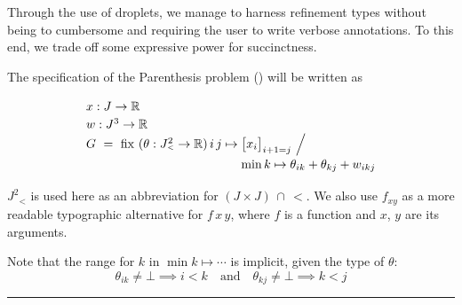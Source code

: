 \cbstart{}%
Through the use of droplets, we manage to harness refinement types without being to 
cumbersome and requiring the user to write verbose annotations.
To this end, we trade off some expressive power for succinctness.
\cbend

\exampleTitle

\noindent
\cbstart{}%
The specification of the Parenthesis problem () will be written as

\vspace{-5mm}
\newcommand\Jsquaredlt{J^2\!\!\!{\scriptscriptstyle _{<}}}
\[
  \renewcommand\arraystretch{1.2}
  \begin{array}{@{}l@{}l@{}l@{}}
    \lspan2{x : J \to \R} \\
    \lspan2{w : J^3 \to \R} \\
    G ~=~ \fix~(\theta:\Jsquaredlt\to\R)\,i\,j \mapsto{}
      & \big[x_i\big]_{i+1=j} ~\Big/ \\
      & \min k\mapsto\theta_{ik}+\theta_{kj}+w_{ikj}
  \end{array}
\]

$\Jsquaredlt$ is used here as an abbreviation for $(J{\times}J)\,{\cap}\,{<}$.
We also use $f_{xy}$
as a more readable typographic alternative for $f\,x\,y$,
where $f$ is a function and $x$, $y$ are its arguments.

Note that the range for $k$ in $\min k\mapsto\cdots$ is implicit, given the type of
$\theta$: 
\vspace{-.5em}
\[\theta_{ik}\neq\bot\implies i<k \quad \mbox{and} \quad \theta_{kj}\neq\bot\implies k<j\]

\vspace{-.5em}
\hrule
\cbend
\medskip

\iffalse
\newcommand\examplePar{%
\vspace{1pt}\noindent\hspace{-2pt}%
\tikz[baseline=(E.base)]\node(E)[rectangle,draw=black!40!white,rounded corners=.7em] {\bf Example.};
}
\examplePar
The array $G$ computed in the Parenthesis example (\Cref{overview:paren spec}) can be typed using:
\[
\begin{array}{l}
  G : ((J\times J)\cap{<}) \to \R \\
\end{array}
\]

This states that $G\,i\,j$ is only defined for $i<j$. It doesn't {\em force} it to be defined,
as it is still a partial function.
\fi

